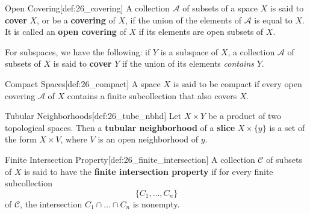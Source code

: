 \begin{defBox}{Open Covering}[def:26_covering]
    A collection \( \mathcal{A} \) of subsets of a space \( X \) is said to 
    \textbf{cover} \( X \), or be a \textbf{covering} of \( X \), if the 
    union of the elements of \( \mathcal{A} \) is equal to \( X \).
    It is called an \textbf{open covering} of \( X \) if its elements are
    open subsets of \( X \).

    \baseSkip

    For subspaces, we have the following: if \( Y \) is a subspace of \( X \),
    a collection \( \mathcal{A} \) of subsets of \( X \) is said to 
    \textbf{cover} \( Y \) if the union of its elements \textit{contains} 
    \( Y \).
\end{defBox}

\begin{defBox}{Compact Spaces}[def:26_compact]
    A space \( X \) is said to be compact if every open covering 
    \( \mathcal{A} \) of \( X \) contains a finite subcollection that also 
    covers \( X \).
\end{defBox}

\begin{defBox}{Tubular Neighborhoods}[def:26_tube_nbhd]
    Let \( X \times Y \) be a product of two topological spaces.
    Then a \textbf{tubular neighborhood} of a \textbf{slice} \( X \times
    \{ y \} \) is a set of the form \( X \times V \), where \( V \) is an 
    open neighborhood of \( y \).
\end{defBox}

\begin{defBox}{Finite Intersection Property}[def:26_finite_intersection]
    A collection \( \mathcal{C} \) of subsets of \( X \) is said to have the 
    \textbf{finite intersection property} if for every finite subcollection
    \begin{equation*}
        \{ C_{ 1 } , \ldots , C_{ n } \}
    \end{equation*}
    of \( \mathcal{C} \), the intersection 
    \( C_{ 1 } \cap \ldots \cap C_{ n } \) is nonempty.
\end{defBox}
